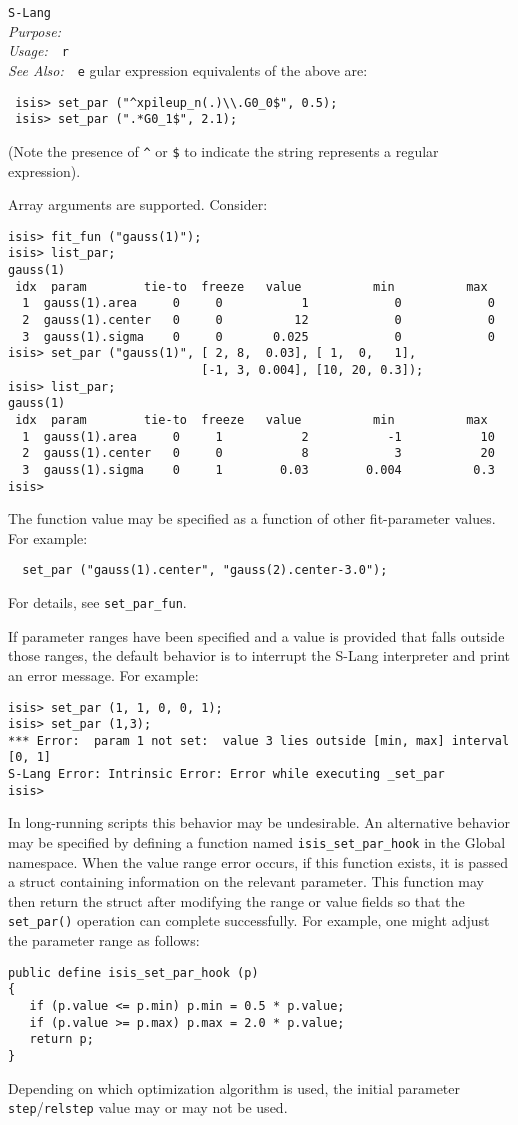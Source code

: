 \documentclass{book}
\makeatletter
\newif\ifpdf
\newcommand{\slang}{{\sc S-Lang}}
\newenvironment{isisfunction}[4]%
{\index{{#1}@{\tt #1}}%
  \ifpdf
  \else
     \addcontentsline{toc}{subsection}{{#1} -- {#2}}
  \fi
  \vbox{
          \vspace*{\baselineskip}
          {\LARGE\tt #1}\vspace*{\baselineskip}\\
          {{\it Purpose:}~~{#2}}\\
          {{\it Usage:}~~{\tt #3}}\\
          {{\it See Also:}~~{\tt #4}}
       }
}%
{ }
\makeatother
\begin{document}
\begin{isisfunction}
\slang\ regular expression equivalents of the above are:
\begin{verbatim}
 isis> set_par ("^xpileup_n(.)\\.G0_0$", 0.5);
 isis> set_par (".*G0_1$", 2.1);
\end{verbatim}
(Note the presence of \verb|^| or \verb|$| %
to indicate the string represents a regular expression).

Array arguments are supported.  Consider:
\begin{verbatim}
isis> fit_fun ("gauss(1)");
isis> list_par;
gauss(1)
 idx  param        tie-to  freeze   value          min          max
  1  gauss(1).area     0     0           1            0            0
  2  gauss(1).center   0     0          12            0            0
  3  gauss(1).sigma    0     0       0.025            0            0
isis> set_par ("gauss(1)", [ 2, 8,  0.03], [ 1,  0,   1],
                           [-1, 3, 0.004], [10, 20, 0.3]);
isis> list_par;
gauss(1)
 idx  param        tie-to  freeze   value          min          max
  1  gauss(1).area     0     1           2           -1           10
  2  gauss(1).center   0     0           8            3           20
  3  gauss(1).sigma    0     1        0.03        0.004          0.3
isis>
\end{verbatim}

The function value may be specified as a function of other
fit-parameter values.  For example:
\begin{verbatim}
  set_par ("gauss(1).center", "gauss(2).center-3.0");
\end{verbatim}
For details, see \verb|set_par_fun|.

If parameter ranges have been specified and a value is provided
that falls outside those ranges, the default behavior is to
interrupt the S-Lang interpreter and print an error message.
For example:
\begin{verbatim}
isis> set_par (1, 1, 0, 0, 1);
isis> set_par (1,3);
*** Error:  param 1 not set:  value 3 lies outside [min, max] interval [0, 1]
S-Lang Error: Intrinsic Error: Error while executing _set_par
isis>
\end{verbatim}
In long-running scripts this behavior may be undesirable. An
alternative behavior may be specified by defining a function
named \verb|isis_set_par_hook| in the Global namespace.  When
the value range error occurs, if this function exists, it is
passed a struct containing information on the relevant
parameter. This function may then return the struct after
modifying the range or value fields so that the
\verb|set_par()| operation can complete successfully.  For
example, one might adjust the parameter range as follows:

\begin{verbatim}
public define isis_set_par_hook (p)
{
   if (p.value <= p.min) p.min = 0.5 * p.value;
   if (p.value >= p.max) p.max = 2.0 * p.value;
   return p;
}
\end{verbatim}

Depending on which optimization algorithm is used, the initial parameter
\verb|step|/\verb|relstep| value may or may not be used.

\end{isisfunction}
\end{document}
